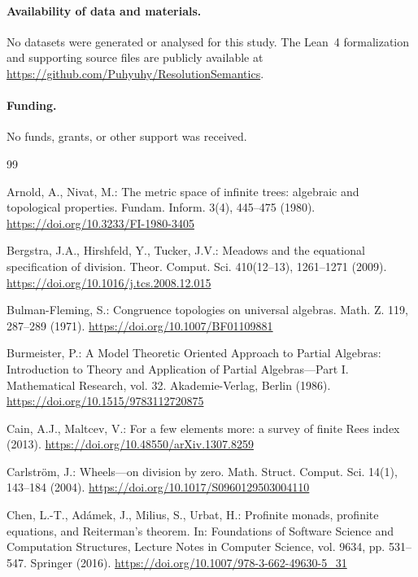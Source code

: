 \documentclass{birkau}
\theoremstyle{definition}
\theoremstyle{remark}
\begin{document}
\paragraph{Availability of data and materials.}
No datasets were generated or analysed for this study.  The Lean~4
formalization and supporting source files are publicly available at
\url{https://github.com/Puhyuhy/ResolutionSemantics}.

\paragraph{Funding.}
No funds, grants, or other support was received.

\begin{thebibliography}{99}

Arnold, A., Nivat, M.: The metric space of infinite trees: algebraic and
topological properties. Fundam. Inform. 3(4), 445--475 (1980).
\url{https://doi.org/10.3233/FI-1980-3405}

Bergstra, J.A., Hirshfeld, Y., Tucker, J.V.: Meadows and the equational
specification of division. Theor. Comput. Sci. 410(12--13), 1261--1271 (2009).
\url{https://doi.org/10.1016/j.tcs.2008.12.015}

Bulman-Fleming, S.: Congruence topologies on universal algebras. Math. Z. 119,
287--289 (1971). \url{https://doi.org/10.1007/BF01109881}

Burmeister, P.: A Model Theoretic Oriented Approach to Partial Algebras:
Introduction to Theory and Application of Partial Algebras---Part I.
Mathematical Research, vol. 32. Akademie-Verlag, Berlin (1986).
\url{https://doi.org/10.1515/9783112720875}

Cain, A.J., Maltcev, V.: For a few elements more: a survey of finite Rees index
(2013). \url{https://doi.org/10.48550/arXiv.1307.8259}

Carlstr\"om, J.: Wheels---on division by zero. Math. Struct. Comput. Sci. 14(1),
143--184 (2004). \url{https://doi.org/10.1017/S0960129503004110}

Chen, L.-T., Ad\'amek, J., Milius, S., Urbat, H.: Profinite monads, profinite
equations, and Reiterman's theorem. In: Foundations of Software Science and
Computation Structures, Lecture Notes in Computer Science, vol. 9634,
pp. 531--547. Springer (2016).
\url{https://doi.org/10.1007/978-3-662-49630-5_31}


\end{thebibliography}
\end{document}
